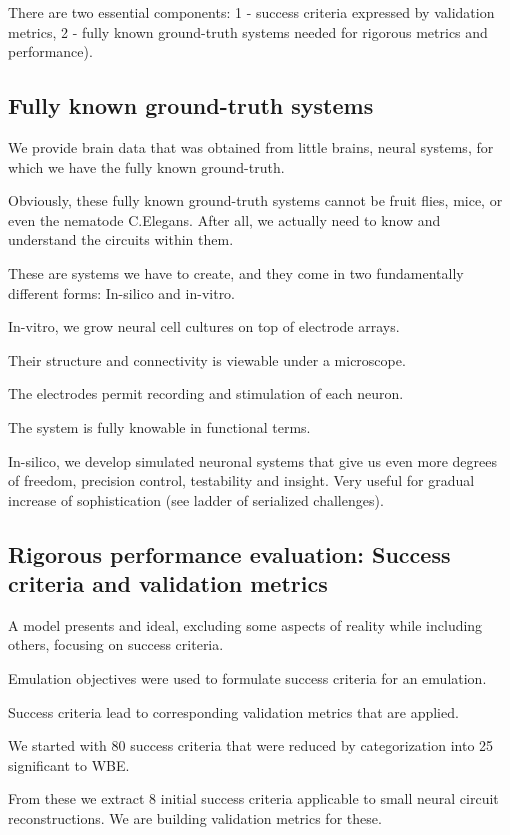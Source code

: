 \documentclass{ldr-article}
\begin{document}
There are two essential components: 1 - success criteria expressed by validation metrics, 2 - fully known ground-truth systems needed for rigorous metrics and performance).

\subsection{Fully known ground-truth systems}

We provide brain data that was obtained from little brains, neural systems, for which we have the fully known ground-truth.

Obviously, these fully known ground-truth systems cannot be fruit flies, mice, or even the nematode C.Elegans. After all, we actually need to know and understand the circuits within them.

These are systems we have to create, and they come in two fundamentally different forms: In-silico and in-vitro.

In-vitro, we grow neural cell cultures on top of electrode arrays.

Their structure and connectivity is viewable under a microscope.

The electrodes permit recording and stimulation of each neuron.

The system is fully knowable in functional terms.

In-silico, we develop simulated neuronal systems that give us even more degrees of freedom, precision control, testability and insight. Very useful for gradual increase of sophistication (see ladder of serialized challenges).

\subsection{Rigorous performance evaluation: Success criteria and validation metrics}

A model presents and ideal, excluding some aspects of reality while including others, focusing on success criteria.

Emulation objectives were used to formulate success criteria for an emulation.

Success criteria lead to corresponding validation metrics that are applied.

We started with 80 success criteria that were reduced by categorization into 25 significant to WBE.

From these we extract 8 initial success criteria applicable to small neural circuit reconstructions. We are building validation metrics for these.
\end{document}
